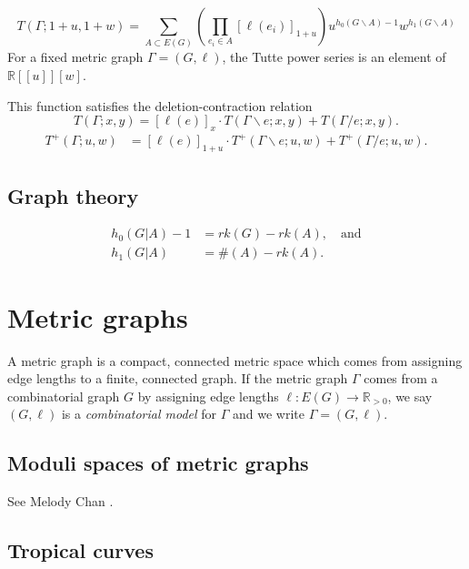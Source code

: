 \documentclass{amsart}
\theoremstyle{definition}
\newcommand{\RR}{\mathbb{R}}
\begin{document}
\begin{equation*}
T(\Gamma; 1+u,1+w) = \sum_{A \subset E(G)} \left( \prod_{e_i \in A} [\ell(e_i)]_{1+u} \right)
u^{h_0(G\backslash A) - 1}w^{h_1(G\backslash A)}
\end{equation*}
For a fixed metric graph $\Gamma = (G,\ell)$, the Tutte power series is an element of 
$\RR[[u]][w]$.

This function satisfies the deletion-contraction relation
\begin{equation*}
T(\Gamma; x,y) = [\ell(e)]_x \cdot T(\Gamma \backslash e; x,y) + T(\Gamma / e; x,y) .
\end{equation*}
\begin{align*}
T^+({\Gamma};u,w) &= 
[\ell(e)]_{1+u} \cdot T^+(\Gamma \backslash e; u,w) 
 + T^+(\Gamma / e; u,w) .
\end{align*}

\subsection{Graph theory}
\begin{align*}
h_0(G| A) - 1 &= rk(G) - rk(A), \quad\text{and}\\
h_1(G| A) &= \#(A) - rk(A) .
\end{align*}


\section{Metric graphs}
A metric graph is a compact, connected metric space which comes from 
assigning edge lengths to a finite, connected graph.
If the metric graph $\Gamma$
comes from a combinatorial graph $G$ by 
assigning edge lengths $\ell : E(G) \to \RR_{>0}$,
we say $(G,\ell)$ is a {\em combinatorial model} for $\Gamma$
and we write $\Gamma = (G,\ell)$.


\subsection{Moduli spaces of metric graphs}
See Melody Chan \cite{Cha}.

\cite{ACP}

\subsection{Tropical curves}
\end{document}
